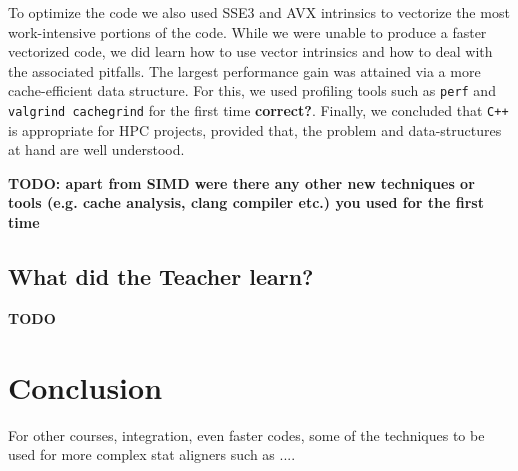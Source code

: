 \documentclass[runningheads,a4paper]{llncs}
\begin{document}
To optimize the code we also used SSE3 and AVX intrinsics to vectorize the most work-intensive portions of the code. 
While we were unable to produce a faster vectorized code, we did learn how to use vector intrinsics and how to deal with the associated pitfalls. 
The largest performance gain was attained via a more cache-efficient data structure. 
For this, we used profiling tools such as \texttt{perf} and \texttt{valgrind cachegrind} for the first time {\bf correct?}. 
Finally,  we concluded that \verb|C++| is appropriate for HPC projects, provided that, the problem and data-structures at hand are well understood.

{\bf TODO: apart from SIMD were there any other new techniques or tools (e.g. cache analysis, clang compiler etc.) you used for the first time}

\subsection{What did the Teacher learn?}

{\bf TODO} 

\section{Conclusion}
\label{conclusion}
For other courses, integration, even faster codes, some of the techniques to be used for more complex stat aligners such as ....







\end{document}
